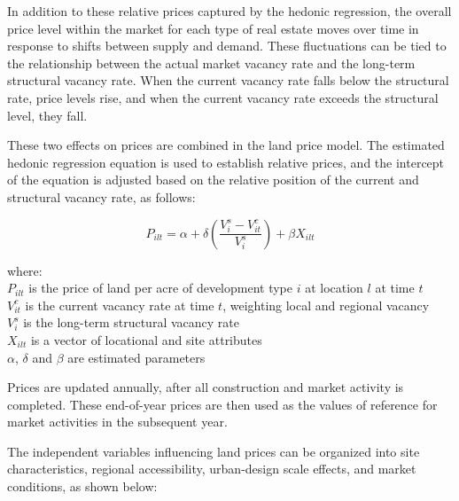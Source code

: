 \documentclass[fleqn]{article}
\begin{document}
In addition to these relative prices captured by the hedonic
regression, the overall price level within the market for each
type of real estate moves over time in response to shifts between
supply and demand.  These fluctuations can be tied to the
relationship between the actual market vacancy rate and the
long-term structural vacancy rate.  When the current vacancy rate
falls below the structural rate, price levels rise, and when the
current vacancy rate exceeds the structural level, they fall.

These two effects on prices are combined in the land price model.
The estimated hedonic regression equation is used to establish
relative prices, and the intercept of the equation is adjusted
based on the relative position of the current and structural
vacancy rate, as follows:

\begin{equation} P_{ilt} =\alpha +
\delta \left(\frac{V^s_i - V^c_{it}}{V^s_{i}}\right) +
\beta X_{ilt}
\end{equation}

\begin{tabbing}
where: \= \\
    \> $P_{ilt}$ is the price of land per acre of development type $i$
    at location $l$ at time $t$ \\
    \> $V^c_{it}$ is the current vacancy rate at time $t$, weighting
    local and regional vacancy \\
    \> $V^s_i$ is the long-term structural vacancy rate \\
    \> $X_{ilt}$ is a vector of locational and site attributes \\
    \> $\alpha$, $\delta$ and $\beta$ are estimated parameters
\end{tabbing}

Prices are updated annually, after all construction and market
activity is completed.  These end-of-year prices are then used as
the values of reference for market activities in the subsequent
year.

The independent variables influencing land prices can be organized
into site characteristics, regional accessibility, urban-design
scale effects, and market conditions, as shown below:
\end{document}

